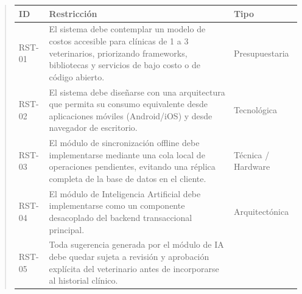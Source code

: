 \documentclass[
]{article}
\newcounter{none} %
\begin{document}
\begin{quote}
{\def\LTcaptype{none} %
\begin{longtable}[]{|
  >{\raggedright\arraybackslash}p{}|
  >{\raggedright\arraybackslash}p{}|
  >{\raggedright\arraybackslash}p{}|}
\hline
\begin{minipage}[b]{\linewidth}\centering
\textbf{ID}
\end{minipage} & \begin{minipage}[b]{\linewidth}\centering
\textbf{Restricción}
\end{minipage} & \begin{minipage}[b]{\linewidth}\centering
\textbf{Tipo}
\end{minipage} \\
\hline
\endhead
\hline
\endlastfoot
RST-01 & El sistema debe contemplar un modelo de costos accesible para
clínicas de 1 a 3 veterinarios, priorizando frameworks, bibliotecas y
servicios de bajo costo o de código abierto. & \begin{minipage}[t]{\linewidth}\raggedright
Presupuestaria
\end{minipage} \\
\hline
RST-02 & El sistema debe diseñarse con una arquitectura que permita su
consumo equivalente desde aplicaciones móviles (Android/iOS) y desde
navegador de escritorio. & \begin{minipage}[t]{\linewidth}\raggedright
Tecnológica
\end{minipage} \\
\hline
RST-03 & El módulo de sincronización offline debe implementarse
mediante una cola local de operaciones pendientes, evitando una
réplica completa de la base de datos en el cliente. & \begin{minipage}[t]{\linewidth}\raggedright
Técnica / Hardware
\end{minipage} \\
\hline
RST-04 & El módulo de Inteligencia Artificial debe implementarse como
un componente desacoplado del backend transaccional principal. & \begin{minipage}[t]{\linewidth}\raggedright
Arquitectónica
\end{minipage} \\
\hline
RST-05 & Toda sugerencia generada por el módulo de IA debe quedar
sujeta a revisión y aprobación explícita del veterinario antes de
incorporarse al historial clínico. & \begin{minipage}[t]{\linewidth}\raggedright

\end{minipage}
\end{longtable}}
\end{quote}
\end{document}
